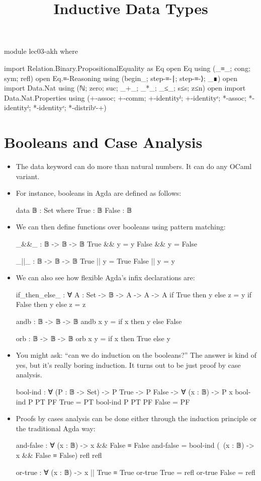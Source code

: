 \documentclass{lecturenotes}
\title{Inductive Data Types}
\begin{document}
\maketitle

\begin{code}
module lec03-akh where

import Relation.Binary.PropositionalEquality as Eq
open Eq using (_≡_; cong; sym; refl)
open Eq.≡-Reasoning using (begin_; step-≡-∣; step-≡-⟩; _∎)
open import Data.Nat using (ℕ; zero; suc; _+_; _*_; _≤_; s≤s; z≤n)
open import Data.Nat.Properties using
  (+-assoc; +-comm; +-identityˡ; +-identityʳ; *-assoc; *-identityˡ; *-identityʳ; *-distribʳ-+)
\end{code}

\section{Booleans and Case Analysis}
\label{sec:bool-case-analys}

\begin{itemize}
\item The \textsf{data} keyword can do more than natural numbers. It can do any OCaml variant.
\item For instance, booleans in Agda are defined as follows:
\begin{code}
data 𝔹 : Set where
  True  : 𝔹
  False : 𝔹
\end{code}
\item We can then define functions over booleans using pattern matching:
\begin{code}
_&&_ : 𝔹 -> 𝔹 -> 𝔹
True && y = y
False && y = False

_||_ : 𝔹 -> 𝔹 -> 𝔹
True || y = True
False || y = y
\end{code}
\item We can also see how flexible Agda's infix declarations are:
\begin{code}
if_then_else_ : ∀ {A : Set} -> 𝔹 -> A -> A -> A
if True then y else z = y
if False then y else z = z

andb : 𝔹 -> 𝔹 -> 𝔹
andb x y = if x then y else False

orb : 𝔹 -> 𝔹 -> 𝔹
orb x y = if x then True else y
\end{code}
\item You might ask: ``can we do induction on the booleans?''
  The answer is kind of yes, but it's really boring induction.
  It turns out to be just proof by case analysis.
\begin{code}
bool-ind : ∀ (P : 𝔹 -> Set) -> P True -> P False -> ∀ (x : 𝔹) -> P x
bool-ind P PT PF True = PT
bool-ind P PT PF False = PF
\end{code}
\item Proofs by cases analysis can be done either through the induction principle or the traditional Agda way:
\begin{code}
and-false : ∀ (x : 𝔹) -> x && False ≡ False
and-false = bool-ind (\ (x : 𝔹) -> x && False ≡ False) refl refl 

or-true : ∀ (x : 𝔹) -> x || True ≡ True
or-true True = refl
or-true False = refl
\end{code}
\end{itemize}
\end{document}
